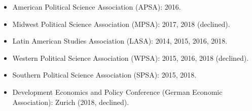 \begin{itemize}
\item American Political Science Association (APSA): 2016.
\item Midwest Political Science Association (MPSA): 2017, 2018 (declined).
\item Latin American Studies Association (LASA): 2014, 2015, 2016, 2018.
\item Western Political Science Association (WPSA): 2015, 2016, 2018 (declined).
\item Southern Political Science Association (SPSA): 2015, 2018.
\item Development Economics and Policy Conference (German Economic Association): Zurich (2018, declined).
\end{itemize}

